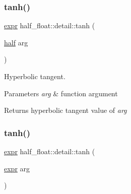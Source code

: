 \mbox{\label{namespacehalf__float_1_1detail_a06795625a388d617e44ea490903c8984}} 
\subsubsection{\texorpdfstring{tanh()}{tanh()}\hspace{0.1cm}{\footnotesize\ttfamily [1/2]}}
{\footnotesize\ttfamily \hyperlink{structhalf__float_1_1detail_1_1expr}{expr} half\+\_\+float\+::detail\+::tanh (\begin{DoxyParamCaption}\item[{\hyperlink{classhalf__float_1_1half}{half}}]{arg }\end{DoxyParamCaption})\hspace{0.3cm}{\ttfamily [inline]}}

Hyperbolic tangent. 
\begin{DoxyParams}{Parameters}
{\em arg} & function argument \\
\hline
\end{DoxyParams}
\begin{DoxyReturn}{Returns}
hyperbolic tangent value of {\itshape arg} 
\end{DoxyReturn}
\mbox{\label{namespacehalf__float_1_1detail_a5c1c93204314b1e36f09f5cd64e53213}} 
\subsubsection{\texorpdfstring{tanh()}{tanh()}\hspace{0.1cm}{\footnotesize\ttfamily [2/2]}}
{\footnotesize\ttfamily \hyperlink{structhalf__float_1_1detail_1_1expr}{expr} half\+\_\+float\+::detail\+::tanh (\begin{DoxyParamCaption}\item[{\hyperlink{structhalf__float_1_1detail_1_1expr}{expr}}]{arg }\end{DoxyParamCaption})\hspace{0.3cm}{\ttfamily [inline]}}

\mbox{\label{namespacehalf__float_1_1detail_a23014ba07b4073225072ecaf1159d106}} 
